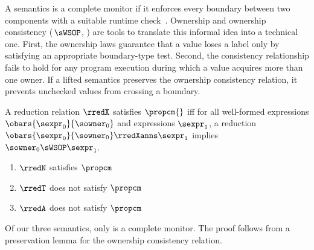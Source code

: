 A semantics is a complete monitor if it enforces every boundary between two
components with a%
suitable runtime check~\cite{dtf-esop-2012}.
Ownership and ownership consistency ($\,\sWSOP$, )
 are tools to translate this informal idea into a technical one.
First, the ownership laws guarantee that a value loses a
 label only by satisfying an appropriate boundary-type test.
Second, the consistency relationship fails to hold for any program
 execution during which a value acquires more than one owner.
If a lifted semantics preserves the ownership consistency relation, it prevents 
 unchecked values from crossing a boundary.

\begin{definition}
  A reduction relation $\rredX$ satisfies $\propcm{}$ iff
  for all well-formed expressions $\obars{\sexpr_0}{\sowner_0}$ and expressions
  $\sexpr_1$, a reduction $\obars{\sexpr_0}{\sowner_0} \rredXanns \sexpr_1$
  implies $\sowner_0 \sWSOP \sexpr_1$.
\end{definition}

\begin{theorem}\label{thm:complete-monitoring}\leavevmode
  \begin{enumerate}
    \itemsep0.8ex
    \item $\rredN$ satisfies\/ $\propcm$
    \item $\rredT$ does not satisfy\/ $\propcm$
    \item $\rredA$ does not satisfy\/ $\propcm$
  \end{enumerate}
\end{theorem}

Of our three semantics, only \Nname{} is a complete monitor.
The proof follows from a preservation lemma for the ownership consistency
relation.

